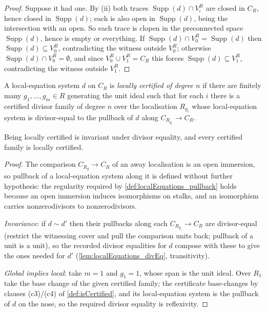 \begin{proof}
  Suppose it had one. By (ii) both traces \(\operatorname{Supp}(d) \cap V_\iota^R\) are
  closed in \(C_R\), hence closed in \(\operatorname{Supp}(d)\); each is also open in
  \(\operatorname{Supp}(d)\), being the intersection with an open. So each trace is clopen
  in the preconnected space \(\operatorname{Supp}(d)\), hence is empty or everything. If
  \(\operatorname{Supp}(d) \cap V_0^R = \operatorname{Supp}(d)\) then
  \(\operatorname{Supp}(d) \subseteq V_0^R\), contradicting the witness outside \(V_0^R\);
  otherwise \(\operatorname{Supp}(d) \cap V_0^R = \emptyset\), and since
  \(V_0^R \cup V_1^R = C_R\) this forces \(\operatorname{Supp}(d) \subseteq V_1^R\),
  contradicting the witness outside \(V_1^R\).
\end{proof}

\begin{definition}
  \label{def:isLocallyCertified}
  \leanok
  A local-equation system \(d\) on \(C_R\) is \emph{locally certified of degree \(n\)} if
  there are finitely many \(g_1, \dots, g_m \in R\) generating the unit ideal such that for
  each \(i\) there is a certified divisor family of degree \(n\) over the localisation
  \(R_{g_i}\) whose local-equation system is divisor-equal to the pullback of \(d\) along
  \(C_{R_{g_i}} \to C_R\).

  Being locally certified is invariant under divisor equality, and every certified family
  is locally certified.
\end{definition}
\begin{proof}
  \leanok
  The comparison \(C_{R_{g}} \to C_R\) of an away localisation is an open immersion, so
  pullback of a local-equation system along it is defined without further hypothesis: the
  regularity required by \ref{def:localEquations_pullback} holds because an open immersion
  induces isomorphisms on stalks, and an isomorphism carries nonzerodivisors to
  nonzerodivisors.

  \emph{Invariance}: if \(d \sim d'\) then their pullbacks along each \(C_{R_{g_i}} \to
  C_R\) are divisor-equal (restrict the witnessing cover and pull the comparison units
  back; pullback of a unit is a unit), so the recorded divisor equalities for \(d\) compose
  with these to give the ones needed for \(d'\) (\ref{lem:localEquations_divEq},
  transitivity).

  \emph{Global implies local}: take \(m = 1\) and \(g_1 = 1\), whose span is the unit
  ideal. Over \(R_1\) take the base change of the given certified family; the certificate
  base-changes by clauses (c3)/(c4) of \ref{def:isCertified}, and its local-equation system
  is the pullback of \(d\) on the nose, so the required divisor equality is reflexivity.
\end{proof}

